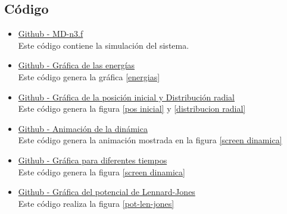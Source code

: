 \documentclass[12pt,letterpaper]{article}
\begin{document}
\begin{multicols}{2}
\section*{Código}
\begin{itemize}
\item \href{https://github.com/giovannilopez9808/Notas_Agosto_2020/blob/master/Simulaciones/Proyecto_1/Scripts/MD-n3.f}{Github - MD-n3.f}\\
Este código contiene la simulación del sistema.
\item \href{https://github.com/giovannilopez9808/Notas_Agosto_2020/blob/master/Simulaciones/Proyecto_1/Scripts/Energy_Graphics.py}{Github - Gráfica de las energías}\\
Este código genera la gráfica \ref{energias}
\item \href{https://github.com/giovannilopez9808/Notas_Agosto_2020/blob/master/Simulaciones/Proyecto_1/Scripts/Cor_Graphics.py}{Github - Gráfica de la posición inicial y Distribución radial}\\
Este código genera la figura \ref{pos inicial} y \ref{distribucion radial}
\item \href{https://github.com/giovannilopez9808/Notas_Agosto_2020/blob/master/Simulaciones/Proyecto_1/Scripts/Dim_gif.py}{Github - Animación de la dinámica}\\
Este código genera la animación mostrada en la figura \ref{screen dinamica}
\item \href{https://github.com/giovannilopez9808/Notas_Agosto_2020/blob/master/Simulaciones/Proyecto_1/Scripts/Dim_Graphics.py}{Github - Gráfica para diferentes tiempos}\\
Este código genera la figura \ref{screen dinamica}

\item \href{https://github.com/giovannilopez9808/Notas_Agosto_2020/blob/master/Simulaciones/Proyecto_1/Scripts/Potencial_Graphics.py}{Github - Gráfica del potencial de Lennard-Jones}\\
Este código realiza la figura \ref{pot-len-jones}
\end{itemize}


\nocite{*}
\end{multicols}
\end{document}
